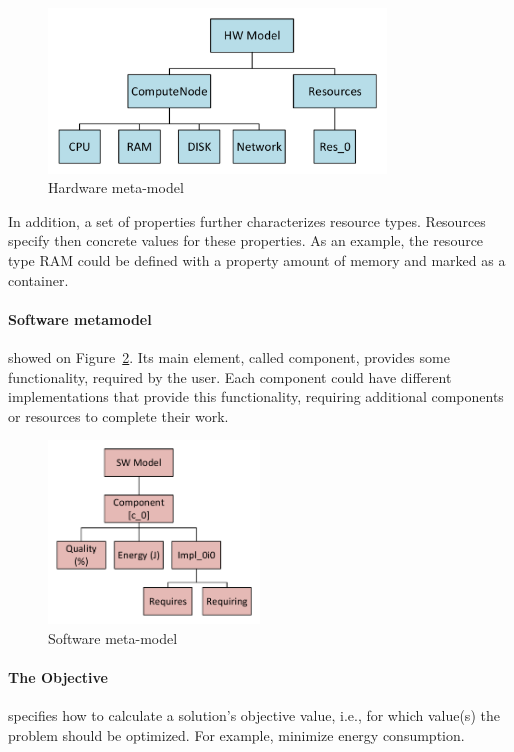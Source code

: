 \begin{figure}
	\centering
	\includegraphics[width=0.8\textwidth]{images/HWModel.pdf}
	\caption[Hardware meta-model]{Hardware meta-model}
	\label{fig:HWmodel}
\end{figure}


In addition, a set of properties further characterizes resource types. Resources specify then concrete values for these properties. As an example, the resource type RAM could be defined with a property amount of memory and marked as a container.

\paragraph{Software metamodel} showed on Figure~\ref{fig:SWModel}. Its main element, called component, provides some functionality, required by the user.
Each component could have different implementations that provide this functionality, requiring additional components or resources to complete their work. 

\begin{figure}
	\centering
	\includegraphics[width=0.5\textwidth]{images/SWModel.pdf}
	\caption[Software meta-model]{Software meta-model}
	\label{fig:SWModel}
\end{figure}

\paragraph{The Objective} specifies how to calculate a solution's objective value, i.e., for which value(s) the problem should be optimized. For example, minimize energy consumption.

